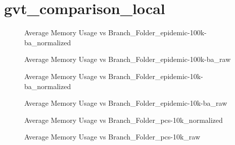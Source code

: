 \section{gvt\_comparison\_local}
\begin{figure}[H]
\centering

\caption{Average Memory Usage vs Branch\_Folder\_epidemic-100k-ba\_normalized}
\end{figure}
\vspace{1cm}
\begin{figure}[H]
\centering

\caption{Average Memory Usage vs Branch\_Folder\_epidemic-100k-ba\_raw}
\end{figure}
\vspace{1cm}
\newpage
\begin{figure}[H]
\centering

\caption{Average Memory Usage vs Branch\_Folder\_epidemic-10k-ba\_normalized}
\end{figure}
\vspace{1cm}
\begin{figure}[H]
\centering

\caption{Average Memory Usage vs Branch\_Folder\_epidemic-10k-ba\_raw}
\end{figure}
\vspace{1cm}
\newpage
\begin{figure}[H]
\centering

\caption{Average Memory Usage vs Branch\_Folder\_pcs-10k\_normalized}
\end{figure}
\vspace{1cm}
\begin{figure}[H]
\centering

\caption{Average Memory Usage vs Branch\_Folder\_pcs-10k\_raw}
\end{figure}
